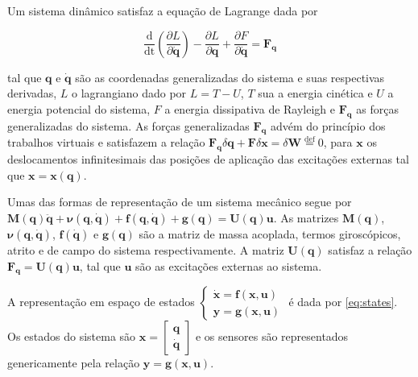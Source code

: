 Um sistema dinâmico satisfaz a equação de Lagrange dada por 

\begin{equation}
    \frac{\mathrm{d}}{\mathrm{dt}} \left( \frac{\partial L}{\partial \mathbf{\dot q}} \right) - \frac{\partial L}{\partial \mathbf{q}} + \frac{\partial F}{\partial \mathbf{\dot q}} = \mathbf{F_q}
\end{equation}

    tal que $\mathbf{q}$ e $\mathbf{\dot q}$ são as coordenadas generalizadas do sistema e suas respectivas derivadas, $L$ o lagrangiano dado por $L = T - U$, $T$ sua a energia cinética e $U$ a energia potencial do sistema, $F$ a energia dissipativa de Rayleigh e $\mathbf{F_q}$ as forças generalizadas do sistema. As forças generalizadas $\mathbf{F_q}$ advém do princípio dos trabalhos virtuais \cite{Beer:2003:VME:1207649} e satisfazem a relação $\mathbf{F_q} \delta{\mathbf{q}} + \mathbf{F}\delta \mathbf{x} = \delta \mathbf{W} \stackrel{\mathrm{def}}{=} 0$, para $\mathbf{x}$ os deslocamentos infinitesimais das posições de aplicação das excitações externas tal que $\mathbf{x} = \mathbf{x}(\mathbf{q})$.
    
    Umas das formas de representação de um sistema mecânico segue por $\mathbf{M}(\mathbf{q}) \mathbf{\ddot q} + \mathbf{\nu}(\mathbf{q}, \mathbf{\dot q}) + \mathbf{f}(\mathbf{q}, \mathbf{\dot q}) + \mathbf{g}(\mathbf{q}) = \mathbf{U}(\mathbf{q}) \mathbf{u}$. As matrizes $\mathbf{M}(\mathbf{q})$, $\mathbf{\nu(\mathbf{q}, \mathbf{\dot q})}$, $\mathbf{f}(\mathbf{\dot q})$ e $\mathbf{g}(\mathbf{q})$ são a matriz de massa acoplada, termos giroscópicos, atrito e de campo do sistema respectivamente. A matriz $\mathbf{U}(\mathbf{q})$ satisfaz a relação $\mathbf{F_q} = \mathbf{U}(\mathbf{q})\mathbf{u}$, tal que $\mathbf{u}$ são as excitações externas ao sistema.

    A representação em espaço de estados $\begin{cases} \mathbf{\dot x} = \mathbf{f}(\mathbf{x}, \mathbf{u}) \\ \mathbf{y} = \mathbf{g}(\mathbf{x}, \mathbf{u}) \end{cases}$ é dada por \eqref{eq:states}. Os estados do sistema são $\mathbf{x} = \begin{bmatrix} \mathbf{q} \\ \mathbf{\dot q} \end{bmatrix}$ e os sensores são representados genericamente pela relação $\mathbf{y} = \mathbf{g}(\mathbf{x}, \mathbf{u})$.
    
